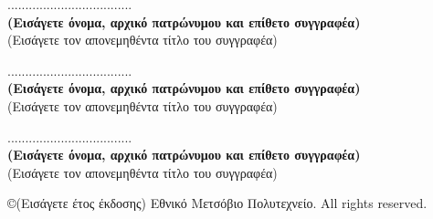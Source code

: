 \documentclass[12pt, twoside, a4paper]{report}
\begin{document}
\vspace{30ex}
\noindent
................................... \\
\textbf{(Εισάγετε όνομα, αρχικό πατρώνυμου και επίθετο συγγραφέα)} \\
(Εισάγετε τον απονεμηθέντα τίτλο του συγγραφέα) \\
\vspace{8ex}

\noindent
................................... \\
\textbf{(Εισάγετε όνομα, αρχικό πατρώνυμου και επίθετο συγγραφέα)} \\
(Εισάγετε τον απονεμηθέντα τίτλο του συγγραφέα) \\
\vspace{8ex}

\noindent
................................... \\
\textbf{(Εισάγετε όνομα, αρχικό πατρώνυμου και επίθετο συγγραφέα)} \\
(Εισάγετε τον απονεμηθέντα τίτλο του συγγραφέα) \\
\vspace{26ex}

\small
\noindent
\copyright \hspace{1em}(Εισάγετε έτος έκδοσης) Εθνικό Μετσόβιο Πολυτεχνείο.
All rights reserved.
\end{document}
